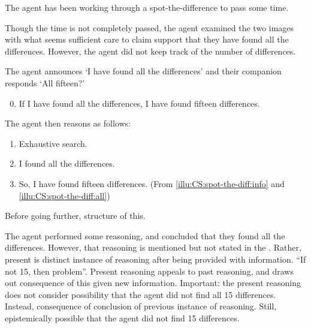 \begin{note}
  \begin{illustration}
    \label{illu:CS:spot-the-diff}
    The agent has been working through a spot-the-difference to pass some time.

    Though the time is not completely passed, the agent examined the two images with what seems sufficient care to claim support that they have found all the differences.
    However, the agent did not keep track of the number of differences.

    The agent announces `I have found all the differences' and their companion responds `All fifteen?'

    \begin{enumerate}[label=\arabic*., ref=(I\ref{illu:CS:spot-the-diff}.\arabic*)]
      \setcounter{enumi}{-1}
    \item
      \label{illu:CS:spot-the-diff:info}
      If I have found all the differences, I have found fifteen differences.
    \end{enumerate}

    The agent then reasons as follows:

    \begin{enumerate}[label=\arabic*., ref=(I\ref{illu:CS:spot-the-diff}.\arabic*), resume]
    \item Exhaustive search.
    \item
      \label{illu:CS:spot-the-diff:all}
      I found all the differences.
    \item
      \label{illu:CS:spot-the-diff:fif}
      So, I have found fifteen differences. \hfill (From \ref{illu:CS:spot-the-diff:info} and \ref{illu:CS:spot-the-diff:all})
    \end{enumerate}
  \end{illustration}

  Before going further, structure of this.

  The agent performed some reasoning, and concluded that they found all the differences.
  However, that reasoning is mentioned but not stated in the .
  Rather, present is distinct instance of reasoning after being provided with information.
  ``If not 15, then problem''.
  Present reasoning appeals to past reasoning, and draws out consequence of this given new information.
  Important: the present reasoning does not consider possibility that the agent did not find all 15 differences.
  Instead, consequence of conclusion of previous instance of reasoning.
  Still, epistemically possible that the agent did not find 15 differences.
\end{note}

